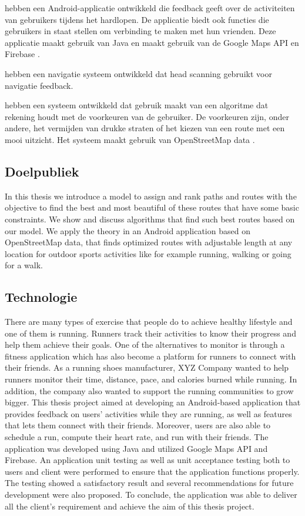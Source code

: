     \textcite{Adwinda2020} hebben een Android-applicatie ontwikkeld die feedback geeft over de activiteiten van gebruikers tijdens het hardlopen.
    De applicatie biedt ook functies die gebruikers in staat stellen om verbinding te maken met hun vrienden. 
    Deze applicatie maakt gebruik van Java en maakt gebruik van de Google Maps API en Firebase \autocite{Adwinda2020}.

    \textcite{Gallo2020} hebben een navigatie systeem ontwikkeld dat head scanning gebruikt voor navigatie feedback.

    \textcite{Novack2018} hebben een systeem ontwikkeld dat gebruik maakt van een algoritme dat rekening houdt met de voorkeuren van de gebruiker.
    De voorkeuren zijn, onder andere, het vermijden van drukke straten of het kiezen van een route met een mooi uitzicht.
    Het systeem maakt gebruik van OpenStreetMap data \autocite{Novack2018}.


    \subsection{Doelpubliek}

    In this thesis we introduce a model to assign and rank paths and routes with
    the objective to find the best and most beautiful of these routes that have some
    basic constraints. We show and discuss algorithms that find such best routes
    based on our model. We apply the theory in an Android application based on
    OpenStreetMap data, that finds optimized routes with adjustable length at any
    location for outdoor sports activities like for example running, walking or going
    for a walk.

    \subsection{Technologie}

    There are many types of exercise that people do to achieve healthy lifestyle and one of them is running. Runners track their activities to
    know their progress and help them achieve their goals. One of the alternatives to monitor is through a fitness application which has also
    become a platform for runners to connect with their friends. As a running shoes manufacturer, XYZ Company wanted to help runners
    monitor their time, distance, pace, and calories burned while running. In addition, the company also wanted to support the running
    communities to grow bigger. This thesis project aimed at developing an Android-based application that provides feedback on users’
    activities while they are running, as well as features that lets them connect with their friends. Moreover, users are also able to schedule a
    run, compute their heart rate, and run with their friends. The application was developed using Java and utilized Google Maps API and
    Firebase. An application unit testing as well as unit acceptance testing both to users and client were performed to ensure that the
    application functions properly. The testing showed a satisfactory result and several recommendations for future development were
    also proposed. To conclude, the application was able to deliver all the client’s requirement and achieve the aim of this thesis project.
    

